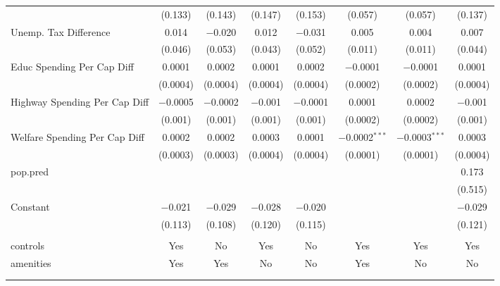 \begin{table}[!htbp]
\begin{tabular}{@{\extracolsep{5pt}}lccccccc}
  & (0.133) & (0.143) & (0.147) & (0.153) & (0.057) & (0.057) & (0.137) \\ 
  Unemp. Tax Difference & 0.014 & $-$0.020 & 0.012 & $-$0.031 & 0.005 & 0.004 & 0.007 \\ 
  & (0.046) & (0.053) & (0.043) & (0.052) & (0.011) & (0.011) & (0.044) \\ 
  Educ Spending Per Cap Diff & 0.0001 & 0.0002 & 0.0001 & 0.0002 & $-$0.0001 & $-$0.0001 & 0.0001 \\ 
  & (0.0004) & (0.0004) & (0.0004) & (0.0004) & (0.0002) & (0.0002) & (0.0004) \\ 
  Highway Spending Per Cap Diff & $-$0.0005 & $-$0.0002 & $-$0.001 & $-$0.0001 & 0.0001 & 0.0002 & $-$0.001 \\ 
  & (0.001) & (0.001) & (0.001) & (0.001) & (0.0002) & (0.0002) & (0.001) \\ 
  Welfare Spending Per Cap Diff & 0.0002 & 0.0002 & 0.0003 & 0.0001 & $-$0.0002$^{***}$ & $-$0.0003$^{***}$ & 0.0003 \\ 
  & (0.0003) & (0.0003) & (0.0004) & (0.0004) & (0.0001) & (0.0001) & (0.0004) \\ 
  pop.pred &  &  &  &  &  &  & 0.173 \\ 
  &  &  &  &  &  &  & (0.515) \\ 
  Constant & $-$0.021 & $-$0.029 & $-$0.028 & $-$0.020 &  &  & $-$0.029 \\ 
  & (0.113) & (0.108) & (0.120) & (0.115) &  &  & (0.121) \\ 
 \hline \\[-1.8ex] 
controls & Yes & No & Yes & No & Yes & Yes & Yes \\ 
amenities & Yes & Yes & No & No & Yes & No & No \\ 
\hline \\[-1.8ex] 
\hline 
\hline \\[-1.8ex] 
\end{tabular} 
\end{table} 
